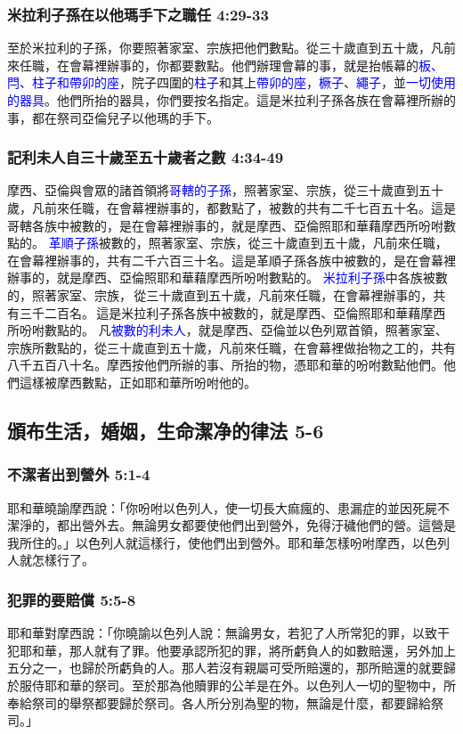\subsubsection{米拉利子孫在以他瑪手下之職任 4:29-33}
至於米拉利的子孫，你要照著家室、宗族把他們數點。從三十歲直到五十歲，凡前來任職，在會幕裡辦事的，你都要數點。他們辦理會幕的事，就是抬帳幕的\textcolor{blue}{板、閂、柱子和帶卯的座}，院子四圍的\textcolor{blue}{柱子}和其上\textcolor{blue}{帶卯的座}，\textcolor{blue}{橛子}、\textcolor{blue}{繩子}，並\textcolor{blue}{一切使用的器具}。他們所抬的器具，你們要按名指定。這是米拉利子孫各族在會幕裡所辦的事，都在祭司亞倫兒子以他瑪的手下。

\subsubsection{記利未人自三十歲至五十歲者之數 4:34-49}
摩西、亞倫與會眾的諸首領將\textcolor{blue}{哥轄的子孫}，照著家室、宗族，從三十歲直到五十歲，凡前來任職，在會幕裡辦事的，都數點了，被數的共有二千七百五十名。這是哥轄各族中被數的，是在會幕裡辦事的，就是摩西、亞倫照耶和華藉摩西所吩咐數點的。
\textcolor{blue}{革順子孫}被數的，照著家室、宗族，從三十歲直到五十歲，凡前來任職，在會幕裡辦事的，共有二千六百三十名。這是革順子孫各族中被數的，是在會幕裡辦事的，就是摩西、亞倫照耶和華藉摩西所吩咐數點的。
\textcolor{blue}{米拉利子孫}中各族被數的，照著家室、宗族， 從三十歲直到五十歲，凡前來任職，在會幕裡辦事的，共有三千二百名。 這是米拉利子孫各族中被數的，就是摩西、亞倫照耶和華藉摩西所吩咐數點的。
凡\textcolor{blue}{被數的利未人}，就是摩西、亞倫並以色列眾首領，照著家室、宗族所數點的，從三十歲直到五十歲，凡前來任職，在會幕裡做抬物之工的，共有八千五百八十名。摩西按他們所辦的事、所抬的物，憑耶和華的吩咐數點他們。他們這樣被摩西數點，正如耶和華所吩咐他的。


\subsection{頒布生活，婚姻，生命潔净的律法 5-6}
\subsubsection{不潔者出到營外 5:1-4 }
耶和華曉諭摩西說：「你吩咐以色列人，使一切長大痲瘋的、患漏症的並因死屍不潔淨的，都出營外去。無論男女都要使他們出到營外，免得汙穢他們的營。這營是我所住的。」以色列人就這樣行，使他們出到營外。耶和華怎樣吩咐摩西，以色列人就怎樣行了。

\subsubsection{犯罪的要賠償 5:5-8}
耶和華對摩西說：「你曉諭以色列人說：無論男女，若犯了人所常犯的罪，以致干犯耶和華，那人就有了罪。他要承認所犯的罪，將所虧負人的如數賠還，另外加上五分之一，也歸於所虧負的人。那人若沒有親屬可受所賠還的，那所賠還的就要歸於服侍耶和華的祭司。至於那為他贖罪的公羊是在外。以色列人一切的聖物中，所奉給祭司的舉祭都要歸於祭司。各人所分別為聖的物，無論是什麼，都要歸給祭司。」

